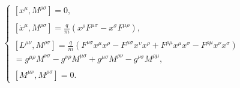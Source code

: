 \begin{equation}
\left\{ 
\begin{array}{c}
\left[ x^{\mu },M^{\rho \sigma }\right] =0, \\ 
\\ 
\left[ \dot{x}^{\mu },M^{\rho \sigma }\right] =\frac{q}{m}\left( x^{\rho
}F^{\mu \sigma }-x^{\sigma }F^{\mu \rho }\right) , \\ 
\\ 
\left[ L^{\mu \nu },M^{\rho \sigma }\right] =\frac{q}{m}\left( F^{\nu \sigma
}x^{\mu }x^{\rho }-F^{\mu \sigma }x^{\upsilon }x^{\rho }+F^{\rho \mu }x^{\mu
}x^{\sigma }-F^{\rho \mu }x^{\nu }x^{\sigma }\right) \\ 
=g^{\mu \rho }M^{\nu \sigma }-g^{\nu \rho }M^{\mu \sigma }+g^{\mu \sigma
}M^{\rho \nu }-g^{\nu \sigma }M^{\rho \mu }, \\ 
\\ 
\left[ M^{\mu \nu },M^{\rho \sigma }\right] =0.
\end{array}
\right.
\end{equation}

